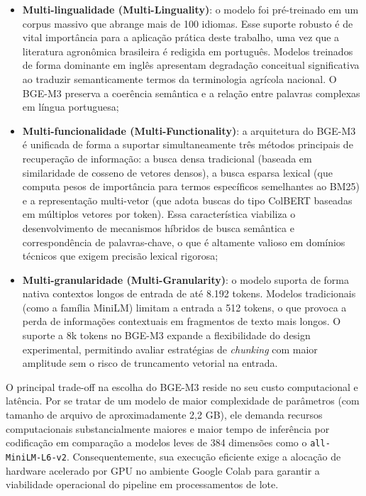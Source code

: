 \documentclass[
	12pt,				%
	openright,			%
	oneside,			%
	a4paper,			%
	tccpreliminar,		%
	]{ABNT-DC-UEL}
\begin{document}
\begin{itemize}
    \item \textbf{Multi-lingualidade (Multi-Linguality)}: o modelo foi pré-treinado em um corpus massivo que abrange mais de 100 idiomas. Esse suporte robusto é de vital importância para a aplicação prática deste trabalho, uma vez que a literatura agronômica brasileira é redigida em português. Modelos treinados de forma dominante em inglês apresentam degradação conceitual significativa ao traduzir semanticamente termos da terminologia agrícola nacional. O BGE-M3 preserva a coerência semântica e a relação entre palavras complexas em língua portuguesa;
    
    \item \textbf{Multi-funcionalidade (Multi-Functionality)}: a arquitetura do BGE-M3 é unificada de forma a suportar simultaneamente três métodos principais de recuperação de informação: a busca densa tradicional (baseada em similaridade de cosseno de vetores densos), a busca esparsa lexical (que computa pesos de importância para termos específicos semelhantes ao BM25) e a representação multi-vetor (que adota buscas do tipo ColBERT baseadas em múltiplos vetores por token). Essa característica viabiliza o desenvolvimento de mecanismos híbridos de busca semântica e correspondência de palavras-chave, o que é altamente valioso em domínios técnicos que exigem precisão lexical rigorosa;
    
    \item \textbf{Multi-granularidade (Multi-Granularity)}: o modelo suporta de forma nativa contextos longos de entrada de até 8.192 tokens. Modelos tradicionais (como a família MiniLM) limitam a entrada a 512 tokens, o que provoca a perda de informações contextuais em fragmentos de texto mais longos. O suporte a 8k tokens no BGE-M3 expande a flexibilidade do design experimental, permitindo avaliar estratégias de \textit{chunking} com maior amplitude sem o risco de truncamento vetorial na entrada.
\end{itemize}

O principal trade-off na escolha do BGE-M3 reside no seu custo computacional e latência. Por se tratar de um modelo de maior complexidade de parâmetros (com tamanho de arquivo de aproximadamente 2,2 GB), ele demanda recursos computacionais substancialmente maiores e maior tempo de inferência por codificação em comparação a modelos leves de 384 dimensões como o \texttt{all-MiniLM-L6-v2}. Consequentemente, sua execução eficiente exige a alocação de hardware acelerado por GPU no ambiente Google Colab para garantir a viabilidade operacional do pipeline em processamentos de lote.
\end{document}
